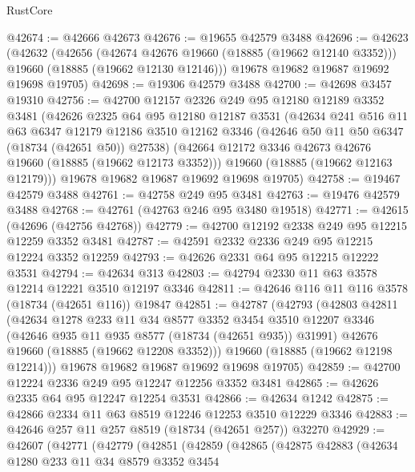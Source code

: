 \begin{lexlean}{RustCore}
\begin{coremodule}
@42674 := @42666 @42673
@42676 := @19655 @42579 @3488
@42696 := @42623
    (@42632
      (@42656
        (@42674 @42676 @19660 (@18885 (@19662 @12140 @3352)))
        @19660
        (@18885 (@19662 @12130 @12146)))
      @19678
      @19682
      @19687
      @19692
      @19698
      @19705)
@42698 := @19306 @42579 @3488
@42700 := @42698 @3457 @19310
@42756 := @42700
    @12157
    @2326
    @249
    @95
    @12180
    @12189
    @3352
    @3481
    (@42626
      @2325
      @64
      @95
      @12180
      @12187
      @3531
      (@42634
        @241
        @516
        @11
        @63
        @6347
        @12179
        @12186
        @3510
        @12162
        @3346
        (@42646 @50 @11 @50 @6347 (@18734 (@42651 @50)) @27538)
        (@42664 @12172 @3346 @42673 @42676 @19660 (@18885 (@19662 @12173 @3352)))
        @19660
        (@18885 (@19662 @12163 @12179)))
      @19678
      @19682
      @19687
      @19692
      @19698
      @19705)
@42758 := @19467 @42579 @3488
@42761 := @42758 @249 @95 @3481
@42763 := @19476 @42579 @3488
@42768 := @42761 (@42763 @246 @95 @3480 @19518)
@42771 := @42615 (@42696 (@42756 @42768))
@42779 := @42700 @12192 @2338 @249 @95 @12215 @12259 @3352 @3481
@42787 := @42591 @2332 @2336 @249 @95 @12215 @12224 @3352 @12259
@42793 := @42626 @2331 @64 @95 @12215 @12222 @3531
@42794 := @42634 @313
@42803 := @42794 @2330 @11 @63 @3578 @12214 @12221 @3510 @12197 @3346
@42811 := @42646 @116 @11 @116 @3578 (@18734 (@42651 @116)) @19847
@42851 := @42787
    (@42793
      (@42803
        @42811
        (@42634
          @1278
          @233
          @11
          @34
          @8577
          @3352
          @3454
          @3510
          @12207
          @3346
          (@42646 @935 @11 @935 @8577 (@18734 (@42651 @935)) @31991)
          @42676
          @19660
          (@18885 (@19662 @12208 @3352)))
        @19660
        (@18885 (@19662 @12198 @12214)))
      @19678
      @19682
      @19687
      @19692
      @19698
      @19705)
@42859 := @42700 @12224 @2336 @249 @95 @12247 @12256 @3352 @3481
@42865 := @42626 @2335 @64 @95 @12247 @12254 @3531
@42866 := @42634 @1242
@42875 := @42866 @2334 @11 @63 @8519 @12246 @12253 @3510 @12229 @3346
@42883 := @42646 @257 @11 @257 @8519 (@18734 (@42651 @257)) @32270
@42929 := @42607
    (@42771
      (@42779
        (@42851
          (@42859
            (@42865
              (@42875
                @42883
                (@42634
                  @1280
                  @233
                  @11
                  @34
                  @8579
                  @3352
                  @3454

\end{coremodule}
\end{lexlean}

